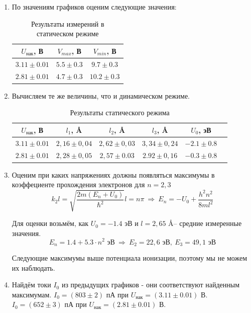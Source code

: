 \begin{enumerate}
		\item По значениям графиков оценим следующие значения:
		\begin{table}[h!]
			\centering
			\begin{tabular}{|c|c|c|}
			\hline
			$U_{\text{нак}}$, В & $V_{max}$, В & $V_{min}$, В   \\ \hline
			$3.11 \pm 0.01$ & $5.5 \pm 0.3$ & $9.7 \pm 0.3$     \\ \hline
			$2.81 \pm 0.01$ & $4.7 \pm 0.3$ & $10.2 \pm 0.3$    \\ \hline
			\end{tabular}
			\caption{Результаты измерений в статическом режиме}
		\end{table}
		\item Вычисляем те же величины, что и динамическом режиме. 
		\begin{table}[h!]
			\centering
			\begin{tabular}{|c|c|c|c|c|c|}
			\hline
			$U_{\text{нак}}$, В & $l_1$, \AA      & $l_2$, \AA      & $l_3$, \AA      & $U_0$, эВ  \\ \hline
			$3.11 \pm 0.01$    & $2,16 \pm 0,04$ & $2,62 \pm 0,03$ & $3,34 \pm 0,24$ & $ -2.1 \pm 0.8 $ \\ \hline
			$2.81 \pm 0.01$    & $2,28 \pm 0,05$ & $2,57 \pm 0.03$ & $2.92 \pm 0,16$ & $ -0.3 \pm 0.8 $  \\ \hline
			\end{tabular}
			\caption{Результаты статического режима}
		\end{table}

		\item Оценим при каких напряжениях должны появляться максимумы в коэффециенте прохождения электронов для $n = 2, 3$
		\[ k_2 l = \sqrt{\frac{2m (E_n + U_0)}{\hbar^2}} l = n \pi ~\Rightarrow~ E_n = - U_0 + \frac{h^2 n^2}{8m l^2}\]

		Для оценки возьмём, как $U_0 = - 1.4 \text{ эВ}$ и $l = 2,65$ \AA -- средние измеренные значения. 
		\[ E_n = 1.4 + 5.3 \cdot n^2 \text{ эВ}~\Rightarrow~ E_2 = 22,6 \text{ эВ}, ~E_3 = 49,1 \text{ эВ} \]

		Следующие максимумы выше потенциала ионизации, поэтому мы не можем их наблюдать.

		\item Найдём токи $I_0$ из предыдущих графиков - они соответствуют найденным максимумам. $I_0 = (803 \pm 2) \text{ пА}$ при $U_{\text{нак}} = (3.11 \pm 0.01) \text{ В}$. 
		$I_0 = (652 \pm 3) \text{ пА}$ при $U_{\text{нак}} = (2.81 \pm 0.01) \text{ В}$.
		

\end{enumerate}
